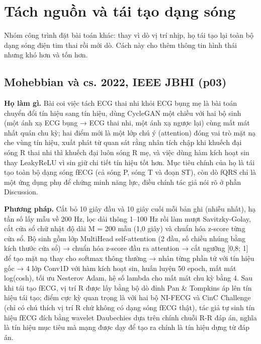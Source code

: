 \documentclass[12pt,a4paper]{article}
\begin{document}
\section{Tách nguồn và tái tạo dạng sóng}
Nhóm công trình đặt bài toán khác: thay vì dò vị trí nhịp, họ tái tạo lại toàn bộ dạng sóng điện tim thai rồi mới dò. Cách này cho thêm thông tin hình thái nhưng khó hơn và tốn hơn.

\subsection{Mohebbian và cs. 2022, IEEE JBHI \normalfont\small (p03)}
\par\vspace{2pt}
\par\vspace{4pt}
\noindent \textbf{Họ làm gì.} Bài coi việc tách ECG thai nhi khỏi ECG bụng mẹ là bài toán chuyển đổi tín hiệu sang tín hiệu, dùng CycleGAN một chiều với hai bộ sinh (một ánh xạ ECG bụng → ECG thai nhi, một ánh xạ ngược lại) cùng mất mát nhất quán chu kỳ; hai điểm mới là một lớp chú ý (attention) đóng vai trò mặt nạ che vùng tín hiệu, xuất phát từ quan sát rằng nhân tích chập khi khuếch đại sóng R thai nhi thì khuếch đại luôn sóng R mẹ, và việc dùng hàm kích hoạt sin thay LeakyReLU vì sin giữ chi tiết tín hiệu tốt hơn. Mục tiêu chính của họ là tái tạo toàn bộ dạng sóng fECG (cả sóng P, sóng T và đoạn ST), còn dò fQRS chỉ là một ứng dụng phụ để chứng minh năng lực, điều chính tác giả nói rõ ở phần Discussion.\par\vspace{3pt}
\noindent \textbf{Phương pháp.} Cắt bỏ 10 giây đầu và 10 giây cuối mỗi bản ghi (nhiễu nhất), hạ tần số lấy mẫu về 200 Hz, lọc dải thông 1–100 Hz rồi làm mượt Savitzky-Golay, cắt cửa sổ chữ nhật độ dài M = 200 mẫu (1,0 giây) và chuẩn hóa z-score từng cửa sổ. Bộ sinh gồm lớp MultiHead self-attention (2 đầu, số chiều nhúng bằng kích thước cửa sổ) → chuẩn hóa z-score đầu ra attention → cắt ngưỡng [0,8; 1] để tạo mặt nạ thay cho softmax thông thường → nhân từng phần tử với tín hiệu gốc → 4 lớp Conv1D với hàm kích hoạt sin, huấn luyện 50 epoch, mất mát log(cosh), tối ưu Nesterov Adam, hệ số lambda cho mất mát chu kỳ bằng 4. Sau khi tái tạo fECG, vị trí R được lấy bằng bộ dò đỉnh Pan \& Tompkins áp lên tín hiệu tái tạo; điểm cực kỳ quan trọng là với hai bộ NI-FECG và CinC Challenge (chỉ có chú thích vị trí R chứ không có dạng sóng fECG thật), tác giả tự sinh tín hiệu fECG đích bằng wavelet Daubechies dựa trên chính chuỗi R-R đáp án, nghĩa là tín hiệu mục tiêu mà mạng được dạy để tạo ra chính là tín hiệu dựng từ đáp án.\par\vspace{3pt}
\end{document}
